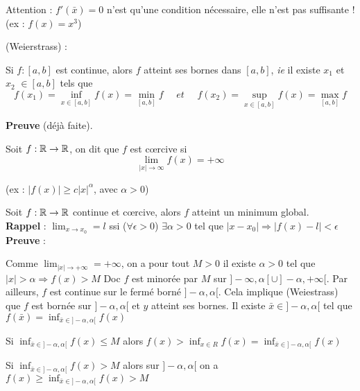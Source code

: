		Attention : $f'(\bar{x}) = 0$ n'est qu'une condition nécessaire, elle n'est pas suffisante ! (ex : $f(x) = x^3$)
		
		\begin{theoreme} (Weierstrass) :

		
		Si $f : [a, b]$ est continue, alors $f$ atteint ses bornes dans $[a, b]$, \textit{ie} il existe $x_1$ et $x_2$ $ \in [a, b]$ tels que \[ f(x_1) = \inf_{x \in [a, b]} f(x) = \min_{[a, b]} f \quad\textit{ et }\quad\displaystyle f(x_2) = \sup_{x \in [a, b]} f(x) = \max_{[a, b]} f\]
		\end{theoreme}
		
		\textbf{Preuve} (déjà faite).\\
		
		\begin{definition}
		
		Soit $f : \mathbb{R} \rightarrow \mathbb{R}$, on dit que $f$ est c\oe rcive si \[ \lim_{|x| \rightarrow \infty} f(x) = + \infty \]
		\end{definition}
		
		(ex : $|f(x)| \geq c|x|^\alpha$, avec $\alpha > 0$)
		
		Soit $f : \mathbb{R} \rightarrow \mathbb{R}$ continue et c\oe rcive, alors $f$ atteint un minimum global.\\
		
		\textbf{Rappel} : $\displaystyle \lim_{x \rightarrow x_0} = l$ ssi ($\forall \epsilon >0$) $\exists \alpha >0$ tel que $|x-x_0| \Rightarrow |f(x) - l| < \epsilon$\\
		
		\textbf{Preuve} :
		
		Comme $\displaystyle \lim_{|x| \rightarrow + \infty} = +\infty$, on a pour tout $M>0$ il existe $\alpha >0$ tel que $|x|>\alpha \Rightarrow f(x)>M$
		Doc $f$ est minorée par $M$ sur $]-\infty, \alpha[ \cup ]-\alpha, +\infty[$. Par ailleurs, $f$ est continue sur le fermé borné $]-\alpha, \alpha[$.
		Cela implique (Weiestrass) que $f$ est bornée sur $]-\alpha, \alpha[$ et $y$ atteint ses bornes.
		Il existe $ \bar{x} \in ]-\alpha, \alpha[$ tel que $\displaystyle f(\bar{x}) = \inf_{\bar{x} \in ]-\alpha, \alpha[} f(x)$
		
		Si $\displaystyle \inf_{\bar{x} \in ]-\alpha, \alpha[} f(x) \leq M$ alors $\displaystyle f(x) > \inf_{x \in R} f(x) = \inf_{\bar{x} \in ]-\alpha, \alpha[} f(x)$
		
		Si $\displaystyle \inf_{\bar{x} \in ]-\alpha, \alpha[} f(x) > M$ alors sur $]-\alpha, \alpha[$ on a $\displaystyle f(x) \geq \inf_{\bar{x} \in ]-\alpha, \alpha[} f(x) > M$
		
